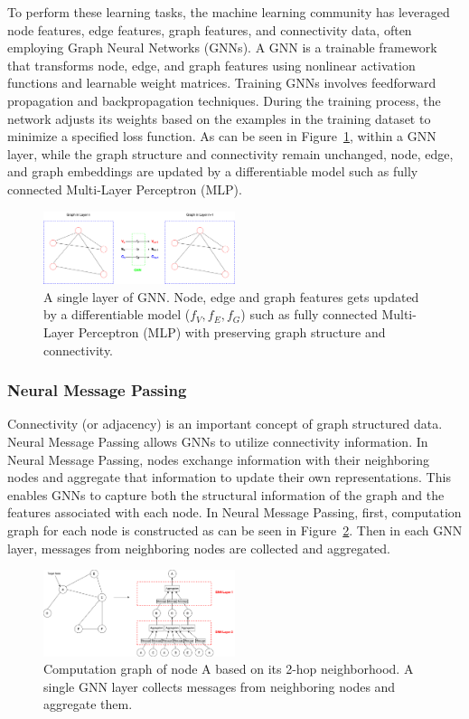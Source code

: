 To perform these learning tasks, the machine learning community has leveraged node features, edge features, graph features, and connectivity data, often employing Graph Neural Networks (GNNs).
A GNN is a trainable framework that transforms node, edge, and graph features using nonlinear activation functions and learnable weight matrices.
Training GNNs involves feedforward propagation and backpropagation techniques.
During the training process, the network adjusts its weights based on the examples in the training dataset to minimize a specified loss function.
As can be seen in Figure~\ref{fig:gnn}, within a GNN layer, while the graph structure and connectivity remain unchanged, node, edge, and graph embeddings are updated by a differentiable model such as fully connected Multi-Layer Perceptron (MLP).


\begin{figure}[htb!]
    \centering
    \includegraphics[width=0.5\textwidth]{figures/GNN}
    \caption{A single layer of GNN.
    Node, edge and graph features gets updated by a differentiable model ($f_V, f_E, f_G$) such as fully connected Multi-Layer Perceptron (MLP) with preserving graph structure and connectivity.}
    \label{fig:gnn}
\end{figure}


\subsubsection{Neural Message Passing}\label{subsec:neural-message-passing}
Connectivity (or adjacency) is an important concept of graph structured data.
Neural Message Passing allows GNNs to utilize connectivity information.
In Neural Message Passing, nodes exchange information with their neighboring nodes and aggregate that information to update their own representations.
This enables GNNs to capture both the structural information of the graph and the features associated with each node.
In Neural Message Passing, first, computation graph for each node is constructed as can be seen in Figure~\ref{fig:message-passing}.
Then in each GNN layer, messages from neighboring nodes are collected and aggregated.


\begin{figure}[htb!]
    \centering
    \includegraphics[width=0.5\textwidth]{figures/Message Passing.drawio}
    \caption{Computation graph of node A based on its 2-hop neighborhood.
    A single GNN layer collects messages from neighboring nodes and aggregate them.}
    \label{fig:message-passing}
\end{figure}


